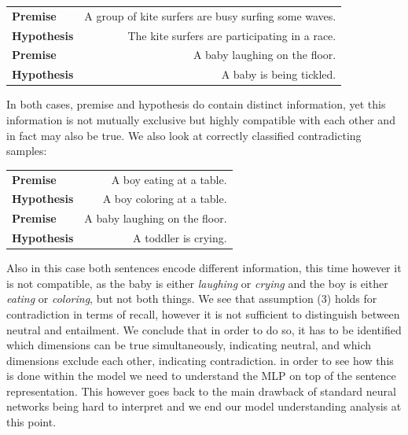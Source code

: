 \begin{center}
\begin{tabular}{lr}
\textbf{Premise} & A group of kite surfers are busy surfing some waves. \\
\textbf{Hypothesis} & The kite surfers are participating in a race. \\
\midrule
\textbf{Premise} & A baby laughing on the floor. \\
\textbf{Hypothesis} & A baby is being tickled.
\end{tabular}
\end{center}
In both cases, premise and hypothesis do contain distinct information, yet this information is not mutually exclusive but highly compatible with each other and in fact may also be true. We also look at correctly classified contradicting samples:
\begin{center}
\begin{tabular}{lr}
\textbf{Premise} & A boy eating at a table. \\
\textbf{Hypothesis} & A boy coloring at a table. \\
\midrule
\textbf{Premise} & A baby laughing on the floor. \\
\textbf{Hypothesis} & A toddler is crying.
\end{tabular}
\end{center}
Also in this case both sentences encode different information, this time however it is not compatible, as the baby is either \textit{laughing} or \textit{crying} and the boy is either \textit{eating} or \textit{coloring}, but not both things. We see that assumption (3) holds for contradiction in terms of recall, however it is not sufficient to distinguish between neutral and entailment. We conclude that in order to do so, it has to be identified which dimensions can be true simultaneously, indicating neutral, and which dimensions exclude each other, indicating contradiction. in order to see how this is done within the model we need to understand the \ac{MLP} on top of the sentence representation. This however goes back to the main drawback of standard neural networks being hard to interpret and we end our model understanding analysis at this point.
